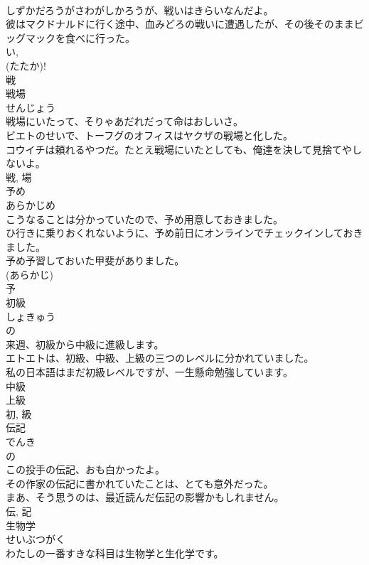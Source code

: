 \documentclass[8pt]{extreport}
\begin{document}
\begin{CJK}{UTF8}{min}
\\	しずかだろうがさわがしかろうが、戦いはきらいなんだよ。	
\\	彼はマクドナルドに行く途中、血みどろの戦いに遭遇したが、その後そのままビッグマックを食べに行った。	
\\	い, 
\\	(たたか)!
\\	戦	
\\	戦場	
\\	せんじょう	
\\	戦場にいたって、そりゃあだれだって命はおしいさ。	
\\	ビエトのせいで、トーフグのオフィスはヤクザの戦場と化した。	
\\	コウイチは頼れるやつだ。たとえ戦場にいたとしても、俺達を決して見捨てやしないよ。	
\\	戦, 場	
\\	予め	
\\	あらかじめ	
\\	こうなることは分かっていたので、予め用意しておきました。	
\\	ひ行きに乗りおくれないように、予め前日にオンラインでチェックインしておきました。	
\\	予め予習しておいた甲斐がありました。	
\\	(あらかじ) 
\\	予	
\\	初級	
\\	しょきゅう	
\\	の 
\\	来週、初級から中級に進級します。	
\\	エトエトは、初級、中級、上級の三つのレベルに分かれていました。	
\\	私の日本語はまだ初級レベルですが、一生懸命勉強しています。	
\\	中級 
\\	上級 
\\	初, 級	
\\	伝記	
\\	でんき	
\\	の 
\\	この投手の伝記、おも白かったよ。	
\\	その作家の伝記に書かれていたことは、とても意外だった。	
\\	まあ、そう思うのは、最近読んだ伝記の影響かもしれません。	
\\	伝, 記	
\\	生物学	
\\	せいぶつがく	
\\	わたしの一番すきな科目は生物学と生化学です。	

\end{CJK}
\end{document}
